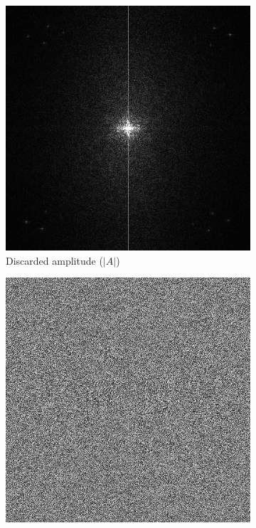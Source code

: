 \begin{figure}[H]
  \centering
  \begin{subfigure}[t]{0.3\textwidth}
    \centering
    \includegraphics[width=\textwidth]{Naive_discarded_amplitude.png}
    \caption{Discarded amplitude ($\vert A\vert$)}
    \label{fig:Naive_discarded_amplitude}
  \end{subfigure}
  \hfill
  \begin{subfigure}[t]{0.3\textwidth}
    \centering
    \includegraphics[width=\textwidth]{Naive_output_holo.png}

\end{subfigure}
\end{figure}
